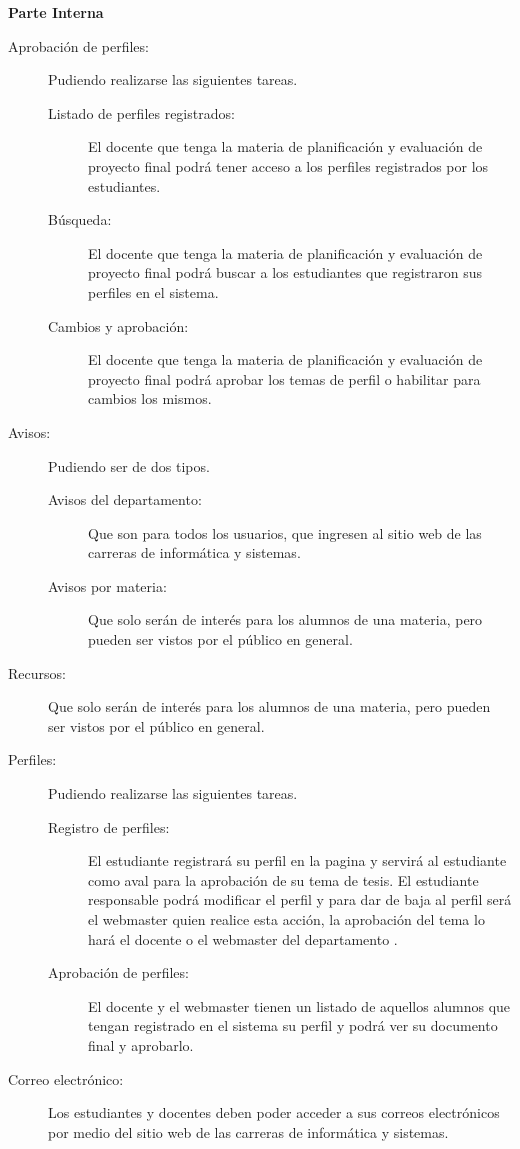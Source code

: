 \documentclass[10pt,letterpaper,twoside]{article}
\newcommand{\ctext}[1]{
    \vspace{5mm}
    {{\textcolor{titlecolor}{\large{\textbf{\textsf{#1}}}}}}
    \\
}
\begin{document}
\begin{multicols}{2}
\ctext{Parte Interna}
\begin{description}
\item [Aprobación de perfiles:] Pudiendo realizarse las siguientes tareas.
\begin{description}
    \item [Listado de perfiles registrados:] El docente que tenga la materia de planificación y evaluación de proyecto final podrá tener acceso a los perfiles registrados por los estudiantes.
    \item [Búsqueda:] El docente que tenga la materia de planificación y evaluación de proyecto final podrá buscar a los estudiantes que registraron sus perfiles en el sistema.
    \item [Cambios y aprobación:] El docente que tenga la materia de planificación y evaluación de proyecto final podrá aprobar los temas de perfil o habilitar para cambios los mismos.
\end{description}
\item [Avisos:] Pudiendo ser de dos tipos.
\begin{description}
    \item [Avisos del departamento:] Que son para todos los usuarios, que ingresen al sitio web de las carreras de informática y sistemas.
    \item [Avisos por materia:] Que solo serán de interés para los alumnos de una materia, pero pueden ser vistos por el público en general.
\end{description}
\item [Recursos:] Que solo serán de interés para los alumnos de una materia, pero pueden ser vistos por el público en general.
\item [Perfiles:] Pudiendo realizarse las siguientes tareas.
\begin{description}
    \item [Registro de perfiles:] El estudiante registrará su perfil en la pagina y servirá al estudiante como aval para la aprobación de su tema de tesis. El estudiante responsable podrá modificar el perfil y para dar de baja al perfil será el webmaster quien realice esta acción, la aprobación del tema lo hará el docente o el webmaster del departamento .
    \item [Aprobación de perfiles:] El docente y el webmaster tienen un listado de aquellos alumnos que tengan registrado en el sistema su perfil y podrá ver su documento final y aprobarlo.
\end{description}
\item [Correo electrónico:] Los estudiantes y docentes deben poder acceder a sus correos electrónicos por medio del sitio web de las carreras de informática y sistemas.

\end{description}
\end{multicols}
\end{document}
